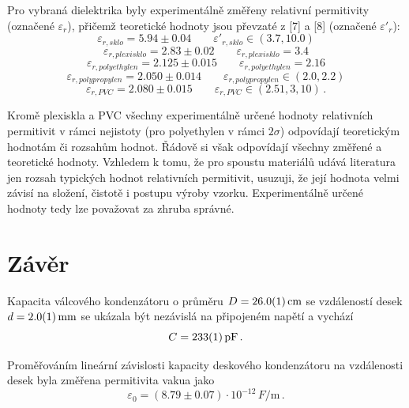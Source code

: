 \documentclass{../concepts/prepareprotokol} %
\begin{document}
Pro vybraná dielektrika byly experimentálně změřeny relativní permitivity (označené $\varepsilon_r$), přičemž teoretické hodnoty jsou převzaté z [7] a [8] (označené $\varepsilon'_r$):
\begin{equation*}
  \varepsilon_{r, sklo} = 5.94 \pm 0.04 \qquad
  \varepsilon'_{r, sklo} \in (3.7, 10.0)
\end{equation*}
\begin{equation*}
  \varepsilon_{r, plexisklo} = 2.83 \pm 0.02 \qquad
  \varepsilon_{r, plexisklo} = 3.4
\end{equation*}
\begin{equation*}
  \varepsilon_{r, polyethylen} = 2.125 \pm 0.015 \qquad
  \varepsilon_{r, polyethylen} = 2.16
\end{equation*}
\begin{equation*}
  \varepsilon_{r, polypropylen} = 2.050 \pm 0.014 \qquad
  \varepsilon_{r, polypropylen} \in (2.0, 2.2)
\end{equation*}
\begin{equation*}
  \varepsilon_{r, PVC} = 2.080 \pm 0.015 \qquad
  \varepsilon_{r, PVC} \in (2.51, 3,10) \,.
\end{equation*}

Kromě plexiskla a PVC všechny experimentálně určené hodnoty relativních permitivit v rámci nejistoty (pro polyethylen v rámci $2\sigma$) odpovídají teoretickým hodnotám či rozsahům hodnot. Řádově si však odpovídají všechny změřené a teoretické hodnoty. Vzhledem k tomu, že pro spoustu materiálů udává literatura jen rozsah typických hodnot relativních permitivit, usuzuji, že její hodnota velmi závisí na složení, čistotě i postupu výroby vzorku. Experimentálně určené hodnoty tedy lze považovat za zhruba správné.

\section{Závěr}

Kapacita válcového kondenzátoru o průměru $D = \SI{26.0\pm0.1}{cm}$ se vzdáleností desek $d = \SI{2.0\pm0.1}{mm}$ se ukázala být nezávislá na připojeném napětí a vychází 
\begin{equation*}
    C = \SI{233\pm1}{pF} \,.
\end{equation*}

Proměřováním lineární závislosti kapacity deskového kondenzátoru na vzdálenosti desek byla změřena permitivita vakua jako
\begin{equation*}
    \varepsilon_0 = \left(8.79 \pm 0.07\right) \cdot 10^{-12} \, \si{F\per\meter} \,.
\end{equation*}
\end{document}
